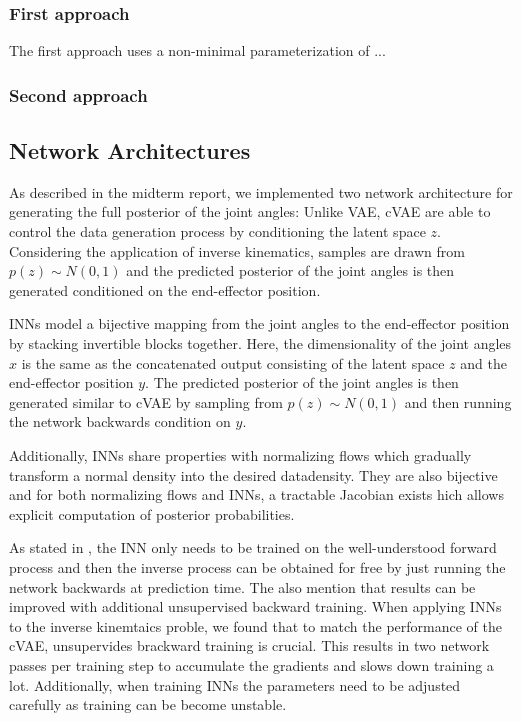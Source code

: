 \documentclass[conference]{IEEEtran}
\begin{document}
\subsubsection*{First approach}
The first approach uses a  non-minimal parameterization of ...

\subsubsection*{Second approach}


\subsection*{Network Architectures}

As described in the midterm report, we implemented two network architecture for generating the full posterior of the joint angles: Unlike VAE, cVAE are able to control the data generation process by conditioning the latent space $z$. Considering the application of inverse kinematics,  samples are drawn from $p(z) \sim N(0, 1)$ and the predicted posterior of the joint angles is then generated conditioned on the end-effector position.

INNs model a bijective mapping from the joint angles to the end-effector position by stacking invertible blocks together. Here, the dimensionality of the joint angles $x$ is the same as the concatenated output consisting of the latent space $z$ and the end-effector position $y$. The predicted posterior of the joint angles is then generated similar to cVAE by sampling from $p(z) \sim N(0, 1)$ and then running the network backwards condition on $y$.

Additionally, INNs share properties with normalizing flows \cite{normalizingFlows2010, normalizingFlows2013} which gradually transform a normal density into the desired datadensity. They are also bijective and for both normalizing flows and INNs, a tractable Jacobian exists hich allows explicit computation of posterior probabilities.

As stated in \cite{Ardizzone2018}, the INN only needs to be trained on the well-understood forward process and then the inverse process can be obtained for free by just running the network backwards at prediction time. The also mention that results can be improved with additional unsupervised backward training. When applying INNs to the inverse kinemtaics proble, we found that to match the performance of the cVAE, unsupervides brackward training is crucial. This results in two network passes per training step to accumulate the gradients and slows down training a lot. Additionally, when training INNs the parameters need to be adjusted carefully as training can be become unstable.
\end{document}
